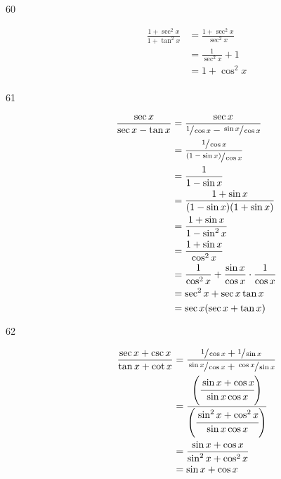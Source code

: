 \documentclass{exam}
\begin{document}
\begin{description}
      \item[60] 
        \begin{align*}
          \frac{1 + \sec^2 x}{1 + \tan^2 x} & = \frac{1 + \sec^2 x}{\sec^2 x} \\
                                            & = \frac{1}{\sec^2 x} + 1 \\
                                            & = 1 + \cos^2 x \\
        \end{align*}

      \item[61] 
        \begin{align*}
          \frac{\sec x}{\sec x - \tan x} & = \frac{\sec x}{\sfrac{1}{\cos x} - \sfrac{\sin x}{\cos x}} \\
                                         & = \frac{\sfrac{1}{\cos x}}{\sfrac{(1 - \sin x)}{\cos x}} \\
                                         & = \frac{1}{1 - \sin x} \\
                                         & = \frac{1 + \sin x}{(1 - \sin x)(1 + \sin x)} \\
                                         & = \frac{1 + \sin x}{1 - \sin^2 x} \\
                                         & = \frac{1 + \sin x}{\cos^2 x} \\
                                         & = \frac{1}{\cos^2 x} + \frac{\sin x}{\cos x} \cdot \frac{1}{\cos x} \\
                                         & = \sec^2 x + \sec x \tan x \\
                                         & = \sec x ( \sec x + \tan x ) \\
        \end{align*}

      \item[62] 
        \begin{align*}
          \frac{\sec x + \csc x}{\tan x + \cot x} & = \frac{\sfrac{1}{\cos x} + \sfrac{1}{\sin x}}{\sfrac{\sin x}{\cos x} + \sfrac{\cos x}{\sin x}} \\
              & = \frac{ \left( \cfrac{\sin x + \cos x}{\sin x \cos x} \right) }{\left( \cfrac{\sin^2 x + \cos^2 x}{\sin x \cos x} \right)} \\
              & = \frac{\sin x + \cos x}{\sin^2 x + \cos^2 x} \\
              & = \sin x + \cos x \\
        \end{align*}


\end{description}
\end{document}

